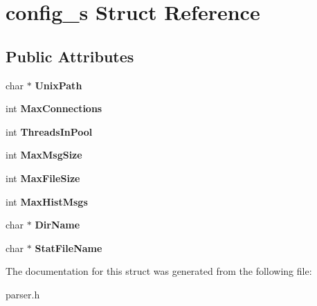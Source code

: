 \hypertarget{structconfig__s}{}\section{config\+\_\+s Struct Reference}
\label{structconfig__s}
\subsection*{Public Attributes}
\begin{DoxyCompactItemize}
\item 
\mbox{\label{structconfig__s_a0cd4128a7e1c25a4735d4f55e5f1ca08}} 
char $\ast$ {\bfseries Unix\+Path}
\item 
\mbox{\label{structconfig__s_a57316191b3c430a9f0242cf14744fe3f}} 
int {\bfseries Max\+Connections}
\item 
\mbox{\label{structconfig__s_ae570dfc9bd511f67f44e2f8a5f9692a4}} 
int {\bfseries Threads\+In\+Pool}
\item 
\mbox{\label{structconfig__s_a6a522c6bd8d4c851fe7a1714f9baba83}} 
int {\bfseries Max\+Msg\+Size}
\item 
\mbox{\label{structconfig__s_a58d5f56cf33d2c86c16ad09f6d97b96a}} 
int {\bfseries Max\+File\+Size}
\item 
\mbox{\label{structconfig__s_a4918ac4b7b476dd5a3c6edbd6404a52b}} 
int {\bfseries Max\+Hist\+Msgs}
\item 
\mbox{\label{structconfig__s_a2cdf18427f853ac237c4131387771716}} 
char $\ast$ {\bfseries Dir\+Name}
\item 
\mbox{\label{structconfig__s_ac8b8d1f02a9cb116cce651cde1444fd8}} 
char $\ast$ {\bfseries Stat\+File\+Name}
\end{DoxyCompactItemize}


The documentation for this struct was generated from the following file\+:\begin{DoxyCompactItemize}
\item 
parser.\+h\end{DoxyCompactItemize}

